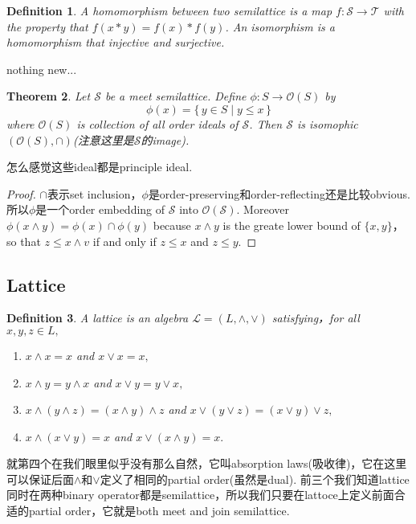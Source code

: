 \documentclass{article}
\newtheorem{theorem}{Theorem}[section]
\newtheorem{definition}[theorem]{Definition}
\newcommand*{\xfunc}[4]{{#2}\colon{#3}{#1}{#4}}
\newcommand*{\func}[3]{\xfunc{\to}{#1}{#2}{#3}}
\newcommand\Set[2]{\{\,#1\mid#2\,\}} %
\newcommand\slattice{\mathcal{S}}
\newcommand\lattice{\mathcal{L}}
\begin{document}
\begin{definition}\rm A {\color{red} homomorphism} between two semilattice is a map $\func{f}{\slattice}{\mathcal{T}}$ with the property that $f(x*y) = f(x) * f(y)$. An {\color{red} isomorphism} is a homomorphism that injective and surjective.
\end{definition}

{\color{blue} nothing new}...

\begin{theorem}
\rm Let $\slattice$ be a meet semilattice. Define $\func{\phi}{S}{\mathcal{O}(S)}$ by
$$
\phi(x) = \Set{y \in S}{y \leq x}
$$
where $\mathcal{O}(S)$ is collection of all order ideals of $\slattice$. Then $\slattice$ is isomophic $(\mathcal{O}(S),\cap)$(注意这里是$\slattice$的image).
\end{theorem}

{\color{blue} 怎么感觉这些ideal都是principle ideal}.

\begin{proof}
$\cap$表示set inclusion，$\phi$是order-preserving和order-reflecting还是比较obvious. 所以$\phi$是一个order embedding of $\slattice$ into $\mathcal{O}(\slattice)$. Moreover $\phi(x \wedge y) = \phi(x) \cap \phi(y)$ because $x \wedge y$ is the greate lower bound of $\{x,y\}$，so that $z \leq x \wedge v$ if and only if $z \leq x$ and $z \leq y$. 
\end{proof}


\newpage
\subsection{Lattice}
\begin{definition}
\rm A {\color{red} lattice} is an algebra $\lattice = (L,\wedge,\vee)$ satisfying，for all $x,y,z \in L,$
\begin{enumerate}
	\item $x \wedge x = x$ and $x \vee x = x,$
	\item $x \wedge y = y \wedge x$ and $x \vee y = y \vee x,$
	\item $x \wedge (y \wedge z) = (x \wedge y) \wedge z$ and $x \vee (y \vee z) = (x \vee y) \vee z,$
	\item $x \wedge (x \vee y) = x$ and $x \vee (x \wedge y) = x.$ 
\end{enumerate}
\end{definition}

{\color{blue} 就第四个在我们眼里似乎没有那么自然，它叫absorption laws(吸收律)，它在这里可以保证后面$\wedge$和$\vee$定义了相同的partial order(虽然是dual). 前三个我们知道lattice同时在两种binary operator都是semilattice，所以我们只要在lattoce上定义前面合适的partial order，它就是both meet and join semilattice}. 
\end{document}
